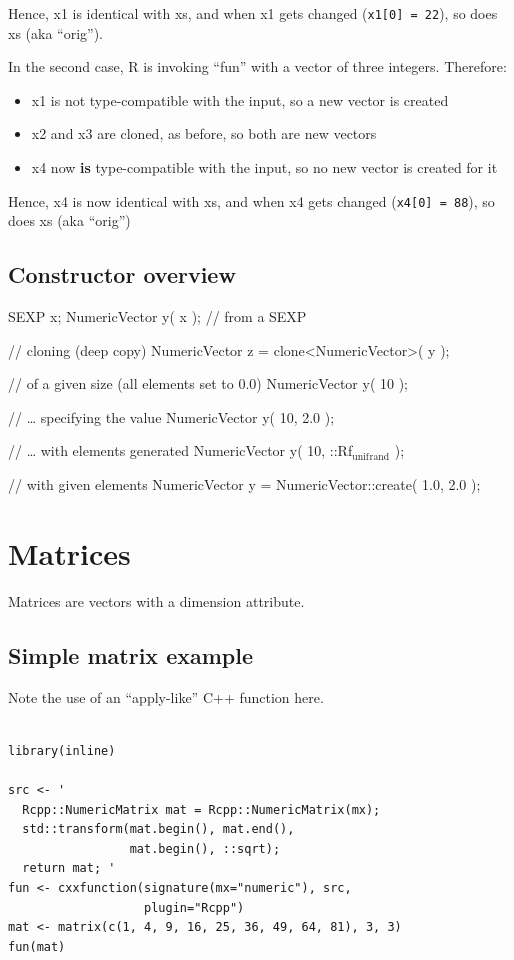 \documentclass[11pt]{article}
\begin{document}
Hence, x1 is identical with xs, and when x1 gets changed (\texttt{x1[0] = 22}), so does xs (aka ``orig'').

In the second case, R is invoking ``fun'' with a vector of three
integers.  Therefore:

\begin{itemize}
\item x1 is not type-compatible with the input, so a new vector is
    created
\item x2 and x3 are cloned, as before, so both are new vectors
\item x4 now \textbf{is} type-compatible with the input, so no new vector is
    created for it
\end{itemize}

Hence, x4 is now identical with xs, and when x4 gets changed (\texttt{x4[0] = 88}), so does xs (aka ``orig'')
\subsection{Constructor overview}
\label{sec-5-2}


SEXP x;
NumericVector y( x ); // from a SEXP

// cloning (deep copy)
NumericVector z = clone<NumericVector>( y );

// of a given size (all elements set to 0.0)
NumericVector y( 10 );

// \ldots{} specifying the value
NumericVector y( 10, 2.0 );

// \ldots{} with elements generated
NumericVector y( 10, ::Rf$_{\mathrm{unif}}$$_{\mathrm{rand}}$ );

// with given elements
NumericVector y = NumericVector::create( 1.0, 2.0 );
\section{Matrices}
\label{sec-6}


Matrices are vectors with a dimension attribute.
\subsection{Simple matrix example}
\label{sec-6-1}


Note the use of an ``apply-like'' C++ function here.


\begin{verbatim}

library(inline)

src <- '
  Rcpp::NumericMatrix mat = Rcpp::NumericMatrix(mx);
  std::transform(mat.begin(), mat.end(),
                 mat.begin(), ::sqrt);
  return mat; '
fun <- cxxfunction(signature(mx="numeric"), src,
                   plugin="Rcpp")
mat <- matrix(c(1, 4, 9, 16, 25, 36, 49, 64, 81), 3, 3)
fun(mat)
\end{verbatim}
\end{document}
